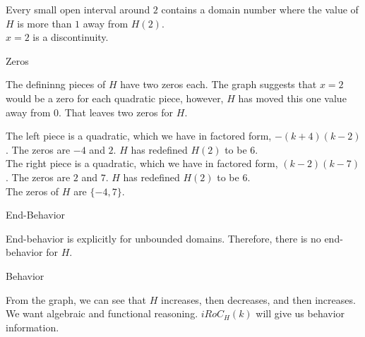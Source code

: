 \documentclass{ximera}
\begin{document}
\begin{exercise}
\begin{question}
Every small open interval around $2$ contains a domain number where the value of $H$ is more than $1$ away from $H(2)$. \\


$x = 2$ is a discontinuity.



\end{question}





\begin{question} Zeros


The defininng pieces of $H$ have two zeros each.  The graph suggests that $x=2$ would be a zero for each quadratic piece, however, $H$ has moved this one value away from $0$.  That leaves two zeros for $H$.


\begin{explanation}



The left piece is a quadratic, which we have in factored form, $-(k+4)(k-2)$.  The zeros are $-4$ and $2$.  $H$ has redefined $H(2)$ to be $6$. \\


The right piece is a quadratic, which we have in factored form, $(k-2)(k-7)$.  The zeros are $2$ and $7$.  $H$ has redefined $H(2)$ to be $6$. \\


The zeros of $H$ are $\{ -4, 7 \}$.


\end{explanation}


\end{question}





\begin{question} End-Behavior



End-behavior is explicitly for unbounded domains.  Therefore, there is no end-behavior for $H$.


\end{question}






\begin{question} Behavior





From the graph, we can see that $H$ increases, then decreases, and then increases.  We want algebraic and functional reasoning. $iRoC_H(k)$ will give us behavior information.   \\



\end{question}
\end{exercise}
\end{document}
